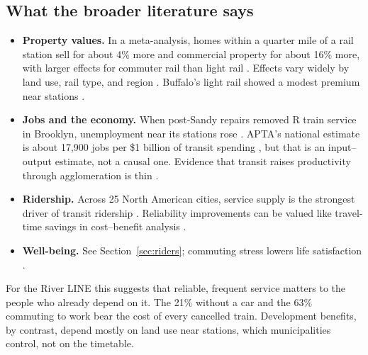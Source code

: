 \documentclass[11pt]{article}
\begin{document}
\subsection{What the broader literature says}
\begin{itemize}
\item \textbf{Property values.} In a meta-analysis, homes within a quarter mile of a rail station sell for about 4\% more and commercial property for about 16\% more, with larger effects for commuter rail than light rail \citep{debrezion2007}. Effects vary widely by land use, rail type, and region \citep{mohammad2013}. Buffalo's light rail showed a modest premium near stations \citep{hess2007}.
\item \textbf{Jobs and the economy.} When post-Sandy repairs removed R train service in Brooklyn, unemployment near its stations rose \citep{tyndall2017}. APTA's national estimate is about 17{,}900 jobs per \$1 billion of transit spending \citep{apta2020econ}, but that is an input--output estimate, not a causal one. Evidence that transit raises productivity through agglomeration is thin \citep{chatman2011agg}.
\item \textbf{Ridership.} Across 25 North American cities, service supply is the strongest driver of transit ridership \citep{boisjoly2018}. Reliability improvements can be valued like travel-time savings in cost--benefit analysis \citep{vanoort2016}.
\item \textbf{Well-being.} See Section~\ref{sec:riders}; commuting stress lowers life satisfaction \citep{stutzer2008,stlouis2014,ettema2010,devos2013}.
\end{itemize}

For the River LINE this suggests that reliable, frequent service matters to the people who already depend on it. The 21\% without a car and the 63\% commuting to work \citep{dvrpc2013} bear the cost of every cancelled train. Development benefits, by contrast, depend mostly on land use near stations, which municipalities control, not on the timetable.

\end{document}
